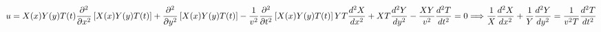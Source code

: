 \documentclass[fleqn]{article}
\begin{document}
\begin{enumerate}
    \textcolor{hwColor}{
      $
        u=X(x)Y(y)T(t) \\
        \\
        \\
        \dfrac{\partial^2}{\partial x^2}\left[X(x)Y(y)T(t) \right]+\dfrac{\partial^2}{\partial y^2}\left[X(x)Y(y)T(t)\right]-\dfrac{1}{v^2}\dfrac{\partial^2}{\partial t^2}\left[X(x)Y(y)T(t)\right] \\
        \\
        \\
        YT \dfrac{d^2 X}{dx^2}+XT\dfrac{d^2 Y}{dy^2}-\dfrac{XY}{v^2} \dfrac{d^2 T}{dt^2}=0 \\
        \\
        \\
        \Longrightarrow \dfrac{1}{X} \dfrac{d^2 X}{dx^2}+\dfrac{1}{Y} \dfrac{d^2 Y}{dy^2}=\dfrac{1}{v^2 T} \dfrac{d^2 T}{dt^2}
      $
    } 
  \end{enumerate}
\end{document}
